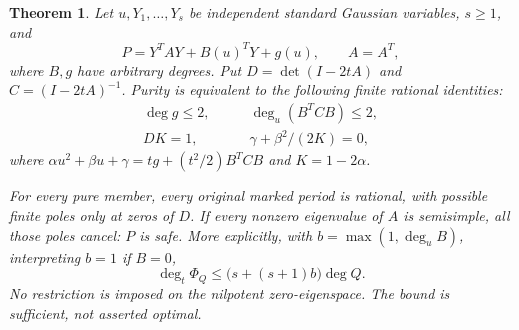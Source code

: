 \documentclass[11pt]{article}
\newtheorem{theorem}{Theorem}[section]
\theoremstyle{definition}\newtheorem{definition}[theorem]{Definition}
\theoremstyle{remark}\newtheorem{remark}[theorem]{Remark}
\begin{document}
\begin{theorem}\label{thm:constantfibres}
Let $u,Y_1,\ldots,Y_s$ be independent standard Gaussian variables,
$s\ge1$, and
\[
 P=Y^TAY+B(u)^TY+g(u),\qquad A=A^T,
\]
where $B,g$ have arbitrary degrees. Put $D=\det(I-2tA)$ and
$C=(I-2tA)^{-1}$. Purity is equivalent to the following finite
rational identities:
\begin{align}
 \deg g\le2,\qquad &\deg_u(B^TCB)\le2,\label{eq:fibredegree}\\
 D K=1,\qquad &\gamma+\beta^2/(2K)=0,\label{eq:fibreunit}
\end{align}
where $\alpha u^2+\beta u+\gamma=tg+(t^2/2)B^TCB$ and
$K=1-2\alpha$.

For every pure member, every original marked period is rational,
with possible finite poles only at zeros of $D$. If every
nonzero eigenvalue of $A$ is semisimple, all those poles cancel:
$P$ is safe. More explicitly, with
$b=\max(1,\deg_u B)$, interpreting $b=1$ if $B=0$,
\begin{equation}\label{eq:fibrecutoff}
 \deg_t\Phi_Q\le\bigl(s+(s+1)b\bigr)\deg Q.
\end{equation}
No restriction is imposed on the nilpotent zero-eigenspace.
The bound is sufficient, not asserted optimal.
\end{theorem}
\end{document}
